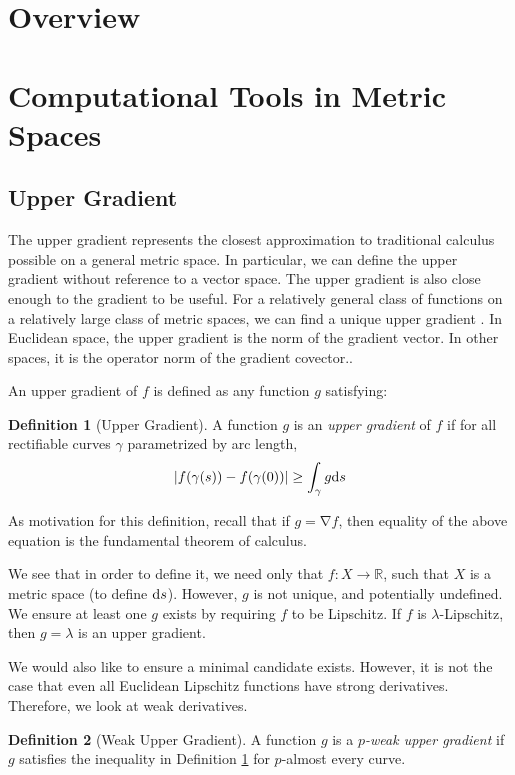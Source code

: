 \documentclass{article}
\theoremstyle{definition}
\theoremstyle{definition}
\newtheorem*{defn}{Definition}
\theoremstyle{plain}
\renewcommand{\(}{\left(}
\renewcommand{\)}{\right)}
\renewcommand{\d}{\textrm d}
\DeclareMathOperator*{\grad}{\nabla}
\begin{document}
\section*{Overview}

\section{Computational Tools in Metric Spaces}

\subsection*{Upper Gradient}
The upper gradient represents the closest approximation to traditional calculus possible on a general metric space.  In particular, we can define the upper gradient without reference to a vector space.  The upper gradient is also close enough to the gradient to be useful.  For a relatively general class of functions on a relatively large class of metric spaces, we can find a unique upper gradient \cite{minimal-upper-gradient}.  In Euclidean space, the upper gradient is the norm of the gradient vector\cite{upper-gradient-euclidean}.  In other spaces, it is the operator norm of the gradient covector.\cite{upper-gradient-manifold}.

An upper gradient of $f$ is defined as any function $g$ satisfying:
\begin{defn}[Upper Gradient]\label{def:upper-gradient}
A function $g$ is an \emph{upper gradient} of $f$ if for all rectifiable curves $\gamma$ parametrized by arc length,
$$\left\vert f(\gamma(s)) - f(\gamma(0)) \right\vert \geq \int_\gamma g\d s $$
\end{defn}
As motivation for this definition, recall that if $g=\grad f$, then equality of the above equation is the fundamental theorem of calculus.

We see that in order to define it, we need only that $f : X \rightarrow \mathbb R$, such that $X$ is a metric space (to define $\d s$).  However, $g$ is not unique, and potentially undefined.  We ensure at least one $g$ exists by requiring $f$ to be Lipschitz.  If $f$ is $\lambda$-Lipschitz, then $g=\lambda$ is an upper gradient.

We would also like to ensure a minimal candidate exists.  However, it is not the case that even all Euclidean Lipschitz functions have strong derivatives.  Therefore, we look at weak derivatives.

\begin{defn}[Weak Upper Gradient]\label{def:weak-upper-gradient}
A function $g$ is a \emph{$p$-weak upper gradient} if $g$ satisfies the inequality in Definition \ref{def:upper-gradient} for $p$-almost every curve.
\end{defn}
\end{document}
